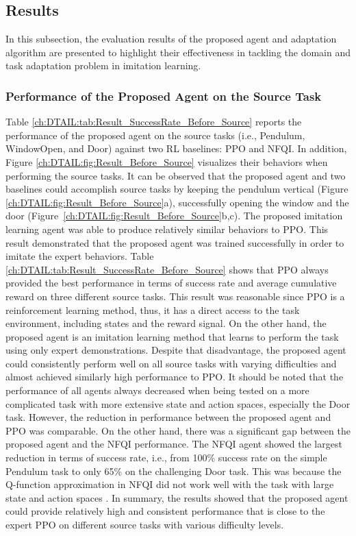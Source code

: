\subsection{Results}
In this subsection, the evaluation results of the proposed agent and adaptation algorithm are presented to highlight their effectiveness in tackling the domain and task adaptation problem in imitation learning.

\subsubsection{Performance of the Proposed Agent on the Source Task}
Table \ref{ch:DTAIL:tab:Result_SuccessRate_Before_Source} reports the performance of the proposed agent on the source tasks (i.e., Pendulum, WindowOpen, and Door) against two RL baselines: PPO and NFQI.
In addition,
Figure \ref{ch:DTAIL:fig:Result_Before_Source} visualizes their behaviors when performing the source tasks.
It can be observed that the proposed agent and two baselines could accomplish source tasks by keeping the pendulum vertical (Figure \ref{ch:DTAIL:fig:Result_Before_Source}a), successfully opening the window and the door (\mbox{Figure \ref{ch:DTAIL:fig:Result_Before_Source}b,c)}.
The proposed imitation learning agent was able to produce relatively similar behaviors to PPO.
This result demonstrated that the proposed agent was trained successfully in order to imitate the expert behaviors.
Table \ref{ch:DTAIL:tab:Result_SuccessRate_Before_Source} shows that PPO always provided the best performance in terms of success rate
and average cumulative reward
on three different source tasks.
This result was reasonable since PPO is a reinforcement learning method,
thus,
it has a direct access to the task environment, including states and the reward signal.
On the other hand,
the proposed agent is an imitation learning method that learns to perform the task using only expert demonstrations.
Despite that disadvantage,
the proposed agent could consistently perform well on all source tasks with varying difficulties and almost achieved similarly high performance to PPO.
It should be noted that the performance of all agents always decreased when being tested on a more complicated task with more extensive state and action spaces,
especially the Door task.
However, the reduction in performance between the proposed agent and PPO was comparable.
On the other hand,
there was a significant gap between the proposed agent and the NFQI performance.
The NFQI agent showed the largest reduction in terms of success rate,
i.e., from 100\% success rate on the simple Pendulum task to only 65\% on the challenging Door task.
This was because the Q-function approximation in NFQI did not work well with the task with large state and action spaces \cite{Baseline_NFQI}.
In summary, the results showed that the proposed agent could provide relatively high and consistent performance that is close to the expert PPO on different source tasks with various difficulty levels.


